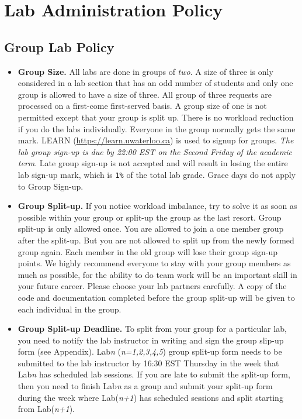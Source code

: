 \chapter*{Lab Administration Policy }

\section*{Group Lab Policy}

    \begin{itemize}
    \item {\bf Group Size.} All labs are done in groups of {\em two}. 
        A size of three is only considered in a lab section that has 
        an odd number of students and only one group is allowed to have
        a size of three. All group of three requests are processed on
        a first-come first-served basis. 
        A group size of one is not permitted except that your group is
        split up. There is no workload reduction if you do 
        the labs individually. 
        Everyone in the group normally gets the same mark.
        LEARN (\url{https://learn.uwaterloo.ca})
        is used to signup for groups.
        {\em The lab group sign-up is due by 22:00 EST on the Second Friday of
        the academic term}. Late group sign-up is not accepted and will
        result in losing the entire lab sign-up mark, which is \verb+1%+
        of the total lab grade. Grace days do not apply to Group Sign-up.
	       
    \item {\bf Group Split-up.} 
            If you notice workload imbalance, try to solve it as soon as possible 
            within your group or split-up the group as the last resort. 
            Group split-up is only allowed once. You are allowed to join a one member group
            after the split-up. But you are not allowed to split up from the newly formed group again.
            Each member in the old group will lose their group sign-up points. 
            We highly recommend everyone to stay with your group members as much as possible,
            for the ability to do team work will be an important skill in your future career.
            Please choose your lab partners carefully. 
            A copy of the code and documentation completed before the group split-up 
            will be given  to each individual in the group.
            
    \item {\bf Group Split-up Deadline.} 
        To split from your group for a particular lab, 
        you need to notify the lab instructor in writing and 
        sign the group slip-up form (see Appendix). 
        Lab{\em n} ({\em n=1,2,3,4,5}) group split-up form needs to 
        be submitted to the lab instructor by 16:30 EST Thursday in the week that Lab{\em n} has 
        scheduled lab sessions. 
        If you are late to submit the split-up form, 
        then you need to finish Lab{\em n} as a group and submit 
        your split-up form during the week where Lab({\em n+1}) 
        has scheduled sessions and split starting from Lab({\em n+1}).
    \end{itemize}
    

